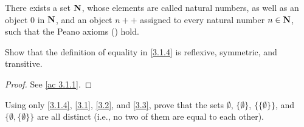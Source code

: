 \begin{axiom}[Infinity]\label{3.7}
  There exists a set \(\mathbf{N}\), whose elements are called natural numbers, as well as an object \(0\) in \(\mathbf{N}\), and an object \(n++\) assigned to every natural number \(n \in \mathbf{N}\), such that the Peano axioms () hold.
\end{axiom}

\exercisesection

\begin{exercise}\label{ex 3.1.1}
  Show that the definition of equality in \cref{3.1.4} is reflexive, symmetric, and transitive.
\end{exercise}

\begin{proof}
  See \cref{ac 3.1.1}.
\end{proof}

\begin{exercise}\label{ex 3.1.2}
  Using only \cref{3.1.4}, \cref{3.1}, \cref{3.2}, and \cref{3.3}, prove that the sets \(\emptyset\), \(\{\emptyset\}\), \(\{\{\emptyset\}\}\), and \(\{\emptyset, \{\emptyset\}\}\) are all distinct
  (i.e., no two of them are equal to each other).
\end{exercise}


